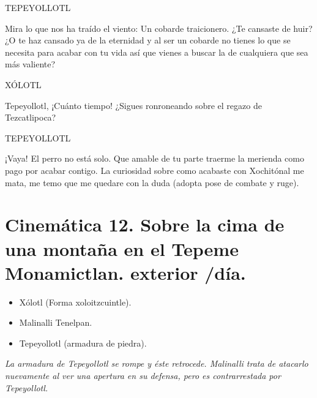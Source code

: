 \documentclass[11pt,letterpaper]{article}
\begin{document}
\begin{center}
TEPEYOLLOTL
\\
\par
Mira lo que nos ha traído el viento: Un cobarde traicionero. ¿Te cansaste de huir? ¿O te haz cansado ya de la eternidad y al ser un cobarde no tienes lo que se necesita para acabar con tu vida así que vienes a buscar la de cualquiera que sea más valiente? 
\\
\par
XÓLOTL
\\
\par
Tepeyollotl, ¡Cuánto tiempo! ¿Sigues ronroneando sobre el regazo de Tezcatlipoca?
\\
\par
TEPEYOLLOTL
\\
\par
¡Vaya! El perro no está solo. Que amable de tu parte traerme la merienda como pago por acabar contigo. La curiosidad sobre como acabaste con Xochitónal me mata, me temo que me quedare con la duda (adopta pose de combate y ruge). 
\end{center}

\section{Cinemática 12. Sobre la cima de una montaña en el Tepeme Monamictlan. exterior /día.}
\textsc{\underline{ }}
\begin{itemize}
\item Xólotl (Forma xoloitzcuintle).
\item Malinalli Tenelpan.
\item Tepeyollotl (armadura de piedra).
\end{itemize}
\textit{La armadura de Tepeyollotl se rompe y éste retrocede. Malinalli trata de atacarlo nuevamente al ver una apertura en su defensa, pero es contrarrestada por Tepeyollotl.}
\end{document}
